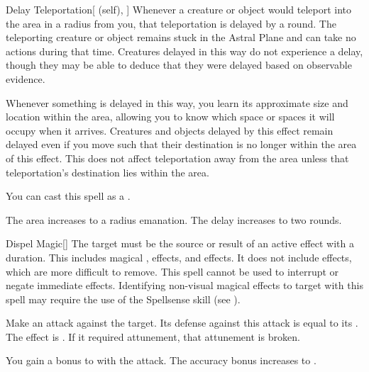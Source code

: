 \lowercase{\hypertarget{spell:Delay Teleportation}{}}\label{spell:Delay Teleportation}
\begin{attuneability}[Rank 4]{\hypertarget{spell:Delay Teleportation}{Delay Teleportation}}[ (self), ]
Whenever a creature or object would teleport into the area in a \arealarge radius  from you, that teleportation is delayed by a round.
The teleporting creature or object remains stuck in the Astral Plane and can take no actions during that time.
Creatures delayed in this way do not experience a delay, though they may be able to deduce that they were delayed based on observable evidence.

Whenever something is delayed in this way, you learn its approximate size and location within the area, allowing you to know which space or spaces it will occupy when it arrives.
Creatures and objects delayed by this effect remain delayed even if you move such that their destination is no longer within the area of this effect.
This does not affect teleportation away from the area unless that teleportation's destination lies within the area.

You can cast this spell as a .

\rankline
{} The area increases to a \areahuge radius emanation.
 The delay increases to two rounds.
\end{attuneability}
\vspace{0.25em}



\lowercase{\hypertarget{spell:Dispel Magic}{}}\label{spell:Dispel Magic}
\begin{freeability}[Rank 4]{\hypertarget{spell:Dispel Magic}{Dispel Magic}}[]
The target must be the source or result of an active  effect with a duration.
This includes magical ,  effects, and  effects.
It does not include  effects, which are more difficult to remove.
This spell cannot be used to interrupt or negate immediate effects.
Identifying non-visual magical effects to target with this spell may require the use of the Spellsense skill (see ).

Make an attack against the target.
Its defense against this attack is equal to its .
\hit The effect is .
If it required attunement, that attunement is broken.

\rankline
{} You gain a  bonus to  with the attack.
 The accuracy bonus increases to .
\end{freeability}
\vspace{0.25em}



